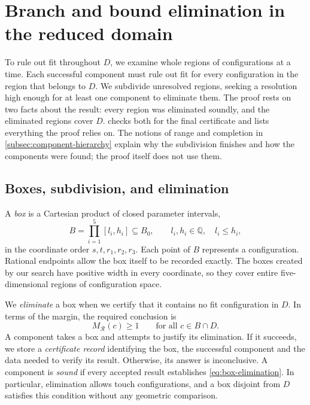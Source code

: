 \section{Branch and bound elimination in the reduced domain}\label{sec:branch-and-bound-elimination-in-the-reduced-domain}

To rule out fit throughout $D$, we examine whole regions of configurations
at a time. Each successful component must rule out fit for every configuration in
the region that belongs to $D$. We subdivide unresolved regions, seeking a
resolution high enough for at least one component to eliminate them.
The proof rests on two facts about the result: every region was eliminated
soundly, and the eliminated regions cover $D$.
 checks both for the
final certificate and lists everything the proof relies on. The notions of
range and completion in \cref{subsec:component-hierarchy} explain why the
subdivision finishes and how the components were found; the proof itself
does not use them.

\subsection{Boxes, subdivision, and elimination}\label{subsec:boxes-subdivision-and-elimination}

A \emph{box} is a Cartesian product of closed parameter intervals,
\[
  B=\prod_{i=1}^{5}[l_i,h_i]\subseteq B_0,
  \qquad l_i,h_i\in\mathbb Q,\quad l_i\le h_i,
\]
in the coordinate order $s,t,r_1,r_2,r_3$. Each point of $B$ represents a
configuration. Rational endpoints allow the box itself
to be recorded exactly. The boxes created by our search have positive
width in every coordinate, so they cover entire five-dimensional regions
of configuration space.

We \emph{eliminate} a box when we certify that it contains no fit
configuration in $D$. In terms of the margin, the required conclusion is
\begin{equation}\label{eq:box-elimination}
  M_{\mathcal R}(c)\ge1\qquad\text{for all }c\in B\cap D.
\end{equation}
A component takes a box and attempts to justify its elimination. If it
succeeds, we store a \emph{certificate record} identifying the box, the
successful component and the data needed to verify its result. Otherwise,
its answer is inconclusive.
A component is \emph{sound} if every accepted result establishes
\cref{eq:box-elimination}.
In particular, elimination allows touch configurations, and a box disjoint
from $D$ satisfies this condition without any geometric comparison.

